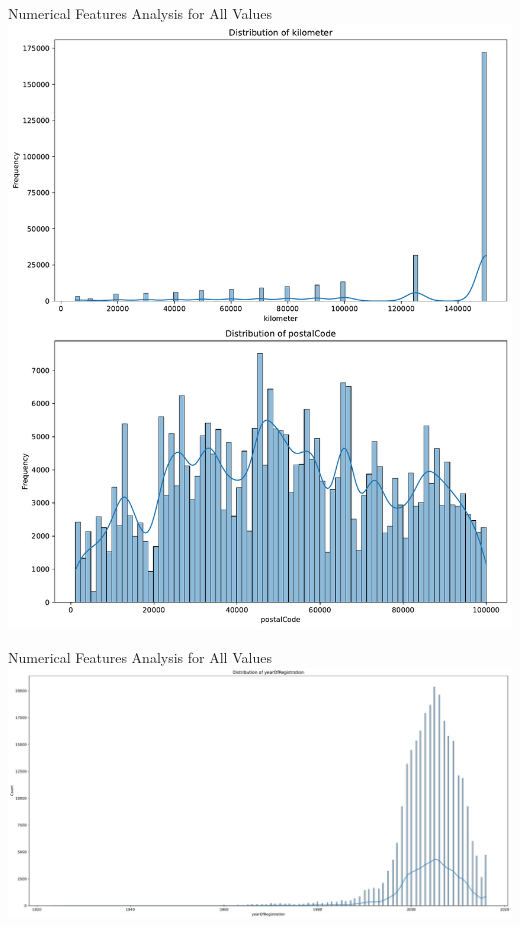 \documentclass{beamer}
\begin{document}
\begin{frame}{Numerical Features Analysis for All Values}
        \center
\includegraphics[scale=0.28]{kilometer_postalCode_distribution.pdf}
\end{frame}

\begin{frame}{Numerical Features Analysis for All Values}
        \center
\includegraphics[scale=0.2]{yearOfRegistration_distribution.pdf}
\end{frame}
\end{document}
